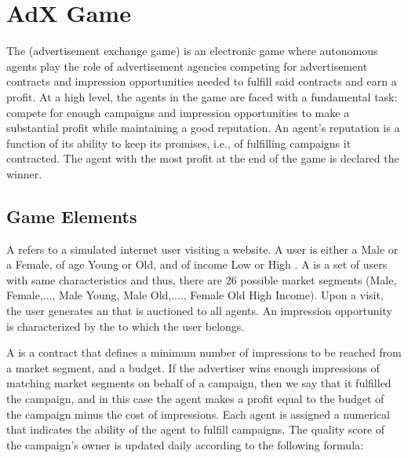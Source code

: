 



\maketitle

\section{AdX Game}

The  (advertisement exchange game) is an electronic game 
where autonomous agents play the role of advertisement agencies competing 
for advertisement contracts and impression opportunities needed to fulfill said 
contracts and earn a profit. At a high level, the agents in the game are faced with 
a fundamental task: compete for enough campaigns and impression opportunities 
to make a substantial profit while maintaining a good reputation. An agent's reputation 
is a function of its ability to keep its promises, i.e., of fulfilling campaigns it contracted.
The agent with the most profit at the end of the game is declared the winner.

\subsection{Game Elements}

A  refers to a simulated internet user visiting a website.
A user is either a Male or a Female, of age Young or Old, and of income Low or High .
A  is a set of users with same characteristics and thus, 
there are 26 possible market segments 
(Male, Female,..., Male Young, Male Old,...., Female Old High Income).
Upon a visit, the user generates an  that is
auctioned to all agents. An impression opportunity is characterized by the 
 to which the user belongs.

A  is a contract that defines a minimum number of impressions
to be reached from a market segment, and a budget. If the advertiser wins enough 
impressions of matching market segments on behalf of a campaign, then we say 
that it fulfilled the campaign, and in this case the agent makes a profit equal to the 
budget of the campaign minus the cost of impressions. Each agent is assigned a 
numerical  that indicates the ability of the agent to fulfill campaigns. 
The quality score of the campaign's owner is updated daily according to the following formula:

